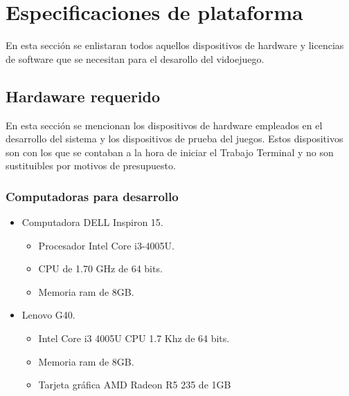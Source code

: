 \section{Especificaciones de plataforma}\label{Sec_Plataforma}
En esta sección se enlistaran todos aquellos dispositivos de hardware y licencias
 de software que se necesitan para el desarollo del vidoejuego.
 
 \subsection{Hardaware requerido}\label{Sec_PlataformaHw}
 En esta sección se mencionan los dispositivos de hardware empleados en el 
 desarrollo del sistema y los dispositivos de prueba del juegos. Estos 
 dispositivos son con los que se contaban a la hora de iniciar el Trabajo Terminal
 y no son sustituibles por motivos de presupuesto.
 	\subsubsection{Computadoras para desarrollo}
 		\begin{itemize}
 			\item Computadora DELL Inspiron 15.
 				\begin{itemize}
 					\item Procesador Intel Core i3-4005U. 
 					\item CPU de 1.70 GHz de 64 bits. 
 					\item Memoria ram de 8GB.
 				\end{itemize}
			\item Lenovo G40. 
				\begin{itemize}
					\item Intel Core i3 4005U CPU 1.7 Khz de 64 bits. 
					\item Memoria ram de 8GB. 
					\item Tarjeta gráfica AMD Radeon R5 235 de 1GB
				\end{itemize}
 		\end{itemize}
 		
